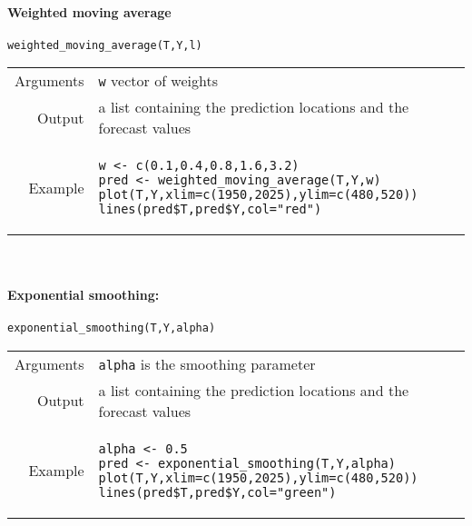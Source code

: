 \documentclass[11pt]{scrartcl}
\begin{document}
\paragraph{Weighted moving average} \verb!weighted_moving_average(T,Y,l)!\\
\begin{tabular}{rl}
	Arguments & \verb!w! vector of weights\\ \vspace{4mm}
	Output & a list containing the prediction locations and the forecast values\\ \vspace{4mm}
	Example & 
	\begin{minipage}{10cm}	
	\begin{verbatim}
w <- c(0.1,0.4,0.8,1.6,3.2)
pred <- weighted_moving_average(T,Y,w)
plot(T,Y,xlim=c(1950,2025),ylim=c(480,520))
lines(pred$T,pred$Y,col="red")
	\end{verbatim}
	\end{minipage}
\end{tabular}\\

\paragraph{Exponential smoothing:} \verb!exponential_smoothing(T,Y,alpha)!\\
\begin{tabular}{rl}
	Arguments & \verb!alpha! is the smoothing parameter\\ \vspace{4mm}
	Output & a list containing the prediction locations and the forecast values\\ \vspace{4mm}
	Example & 
	\begin{minipage}{10cm}	
	\begin{verbatim}
alpha <- 0.5
pred <- exponential_smoothing(T,Y,alpha)
plot(T,Y,xlim=c(1950,2025),ylim=c(480,520))
lines(pred$T,pred$Y,col="green")
	\end{verbatim}
	\end{minipage}
\end{tabular}\\

\end{document}
